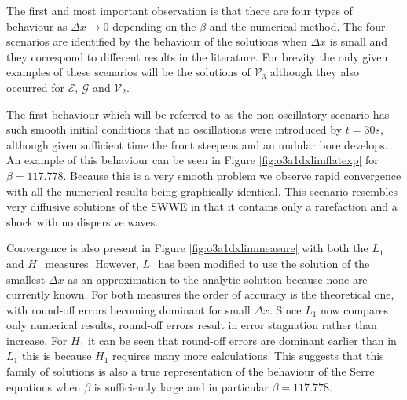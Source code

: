 \documentclass[SingleSpace,12pt,Journal]{Serre_ASCE}
\begin{document}
The first and most important observation is that there are four types of behaviour as $\Delta x \rightarrow 0$ depending on the $\beta$ and the numerical method. The four scenarios are identified by the behaviour of the solutions when $\Delta x$ is small and they correspond to different results in the literature. For brevity the only given examples of these scenarios will be the solutions of $\mathcal{V}_3$ although they also occurred for $\mathcal{E}$, $\mathcal{G}$ and $\mathcal{V}_2$.

The first behaviour which will be referred to as the non-oscillatory scenario has such smooth initial conditions that no oscillations were introduced by $t= 30s$, although given sufficient time the front steepens and an undular bore develops. An example of this behaviour can be seen in Figure \ref{fig:o3a1dxlimflatexp} for $\beta = 117.778$. Because this is a very smooth problem we observe rapid convergence with all the numerical results being graphically identical. This scenario resembles very diffusive solutions of the SWWE in that it contains only a rarefaction and a shock with no dispersive waves. 

Convergence is also present in Figure \ref{fig:o3a1dxlimmeasure} with both the $L_1$ and $H_1$ measures. However, $L_1$ has been modified to use the solution of the smallest $\Delta x$ as an approximation to the analytic solution because none are currently known. For both measures the order of accuracy is the theoretical one, with round-off errors becoming dominant for small $\Delta x$. Since $L_1$ now compares only numerical results, round-off errors result in error stagnation rather than increase. For $H_1$ it can be seen that round-off errors are dominant earlier than in $L_1$ this is because $H_1$ requires many more calculations. This suggests that this family of solutions is also a true representation of the behaviour of the Serre equations when $\beta$ is sufficiently large and in particular $\beta = 117.778$. 
\end{document}
